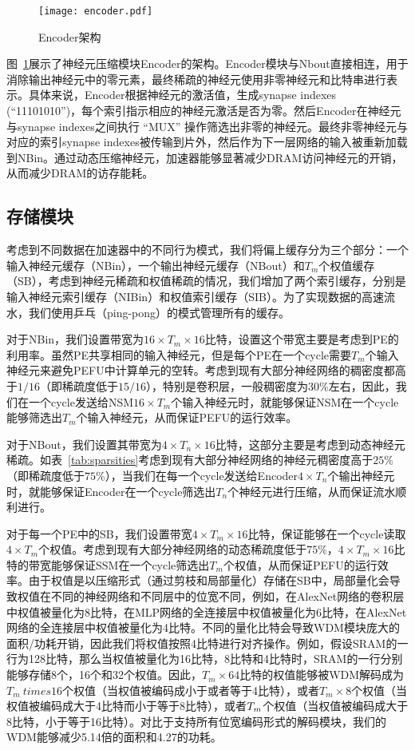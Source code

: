 \begin{figure}[h]
\centering
\texttt{[image: encoder.pdf]}
\caption{Encoder架构}
\label{fig:encoder}
\end{figure}

图~\ref{fig:encoder}展示了神经元压缩模块Encoder的架构。Encoder模块与Nbout直接相连，用于消除输出神经元中的零元素，最终稀疏的神经元使用非零神经元和比特串进行表示。具体来说，Encoder根据神经元的激活值，生成synapse indexes (“11101010”)，每个索引指示相应的神经元激活是否为零。然后Encoder在神经元与synapse indexes之间执行 “MUX” 操作筛选出非零的神经元。最终非零神经元与对应的索引synapse indexes被传输到片外，然后作为下一层网络的输入被重新加载到NBin。通过动态压缩神经元，加速器能够显著减少DRAM访问神经元的开销，从而减少DRAM的访存能耗。

\subsection{存储模块}
\label{subsec:storage}

考虑到不同数据在加速器中的不同行为模式，我们将偏上缓存分为三个部分：一个输入神经元缓存（NBin），一个输出神经元缓存（NBout）和$T_m$个权值缓存（SB），考虑到神经元稀疏和权值稀疏的情况，我们增加了两个索引缓存，分别是输入神经元索引缓存（NIBin）和权值索引缓存（SIB）。为了实现数据的高速流水，我们使用乒乓（ping-pong）的模式管理所有的缓存。

对于NBin，我们设置带宽为$16\times T_m \times 16$比特，设置这个带宽主要是考虑到PE的利用率。虽然PE共享相同的输入神经元，但是每个PE在一个cycle需要$T_m$个输入神经元来避免PEFU中计算单元的空转。考虑到现有大部分神经网络的稠密度都高于$1/16$（即稀疏度低于$15/16$），特别是卷积层，一般稠密度为$30\%$左右，因此，我们在一个cycle发送给NSM$16\times T_m$个输入神经元时，就能够保证NSM在一个cycle能够筛选出$T_m$个输入神经元，从而保证PEFU的运行效率。

对于NBout，我们设置其带宽为$4\times T_n \times 16$比特，这部分主要是考虑到动态神经元稀疏。如表~\ref{tab:sparsities}考虑到现有大部分神经网络的神经元稠密度高于$25\%$（即稀疏度低于$75\%$），当我们在每一个cycle发送给Encoder$4\times T_n$个输出神经元时，就能够保证Encoder在一个cycle筛选出$T_n$个神经元进行压缩，从而保证流水顺利进行。

对于每一个PE中的SB，我们设置带宽$4\times T_m\times 16$比特，保证能够在一个cycle读取$4\times T_m$个权值。考虑到现有大部分神经网络的动态稀疏度低于$75\%$，$4\times T_m \times 16$比特的带宽能够保证SSM在一个cycle筛选出$T_m$个权值，从而保证PEFU的运行效率。由于权值是以压缩形式（通过剪枝和局部量化）存储在SB中，局部量化会导致权值在不同的神经网络和不同层中的位宽不同，例如，在AlexNet网络的卷积层中权值被量化为8比特，在MLP网络的全连接层中权值被量化为6比特，在AlexNet网络的全连接层中权值被量化为4比特。不同的量化比特会导致WDM模块庞大的面积/功耗开销，因此我们将权值按照4比特进行对齐操作。例如，假设SRAM的一行为128比特，那么当权值被量化为16比特，8比特和4比特时，SRAM的一行分别能够存储8个，16个和32个权值。因此，$T_m \times 64$比特的权值能够被WDM解码成为$T_m \ times 16$个权值（当权值被编码成小于或者等于4比特），或者$T_m \times 8$个权值（当权值被编码成大于4比特而小于等于8比特），或者$T_m \time 4$个权值（当权值被编码成大于8比特，小于等于16比特）。对比于支持所有位宽编码形式的解码模块，我们的WDM能够减少5.14倍的面积和4.27的功耗。

